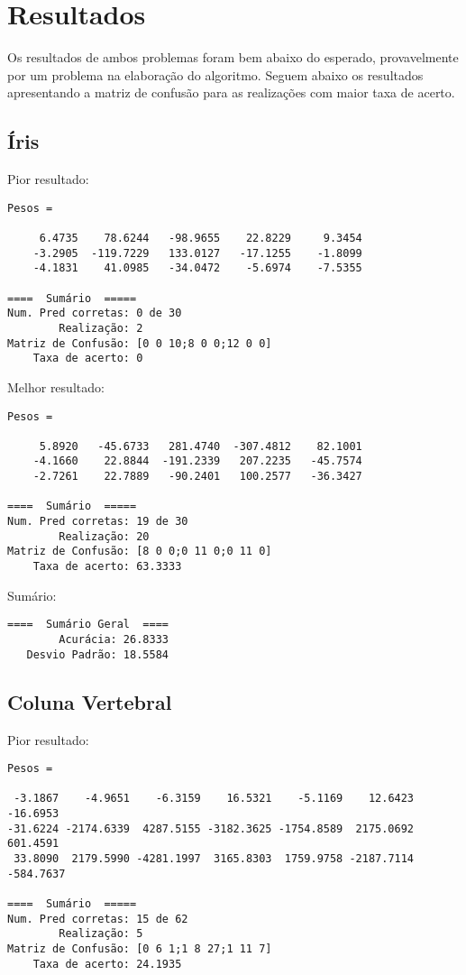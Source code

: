 \section{Resultados}

Os resultados de ambos problemas foram bem abaixo do esperado,
provavelmente por um problema na elaboração do algoritmo. Seguem abaixo
os resultados apresentando a matriz de confusão para as realizações com
maior taxa de acerto.

\subsection{Íris}

Pior resultado:

\begin{verbatim}
Pesos =

     6.4735    78.6244   -98.9655    22.8229     9.3454
    -3.2905  -119.7229   133.0127   -17.1255    -1.8099
    -4.1831    41.0985   -34.0472    -5.6974    -7.5355

====  Sumário  =====
Num. Pred corretas: 0 de 30
        Realização: 2
Matriz de Confusão: [0 0 10;8 0 0;12 0 0]
    Taxa de acerto: 0
\end{verbatim}

Melhor resultado:

\begin{verbatim}
Pesos =

     5.8920   -45.6733   281.4740  -307.4812    82.1001
    -4.1660    22.8844  -191.2339   207.2235   -45.7574
    -2.7261    22.7889   -90.2401   100.2577   -36.3427

====  Sumário  =====
Num. Pred corretas: 19 de 30
        Realização: 20
Matriz de Confusão: [8 0 0;0 11 0;0 11 0]
    Taxa de acerto: 63.3333
\end{verbatim}

Sumário:

\begin{verbatim}
====  Sumário Geral  ====
        Acurácia: 26.8333
   Desvio Padrão: 18.5584
\end{verbatim}

\subsection{Coluna Vertebral}

Pior resultado:

\begin{verbatim}
Pesos =

 -3.1867    -4.9651    -6.3159    16.5321    -5.1169    12.6423  -16.6953
-31.6224 -2174.6339  4287.5155 -3182.3625 -1754.8589  2175.0692  601.4591
 33.8090  2179.5990 -4281.1997  3165.8303  1759.9758 -2187.7114 -584.7637

====  Sumário  =====
Num. Pred corretas: 15 de 62
        Realização: 5
Matriz de Confusão: [0 6 1;1 8 27;1 11 7]
    Taxa de acerto: 24.1935
\end{verbatim}

